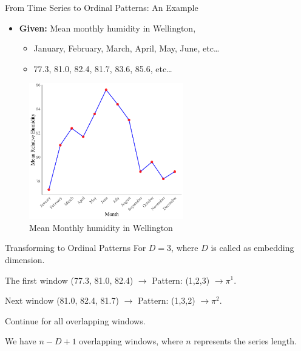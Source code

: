 \documentclass{beamer}
\begin{document}
\begin{frame}{From Time Series to Ordinal Patterns: An Example}
	\begin{itemize}
		\item \textbf{Given:} Mean monthly humidity in Wellington,
		\begin{itemize}
			\item January, February, March, April, May, June, etc\dots
			\item 77.3, 81.0, 82.4, 81.7, 83.6, 85.6, etc\dots 
		\end{itemize}
	\end{itemize}
\begin{figure}[hbt]
	\centering
	\includegraphics[width=0.6\textwidth]{humidity graph}
	\caption{Mean Monthly humidity in Wellington}
	\label{fig:humidity}
\end{figure}	
	
\end{frame}

\begin{frame}{Transforming to Ordinal Patterns}
	For $D=3$, where $D$ is called as \alert{embedding dimension}.
	
	The first window (77.3, 81.0, 82.4) $\rightarrow$ Pattern: (1,2,3) $\rightarrow \pi^1$.
	
	Next window (81.0, 82.4, 81.7) $\rightarrow$ Pattern: (1,3,2) $\rightarrow \pi^2$.
	
	Continue for all overlapping windows.
	
	We have $n-D+1$ overlapping windows, where $n$ represents the series length. 
\end{frame}

\end{document}
